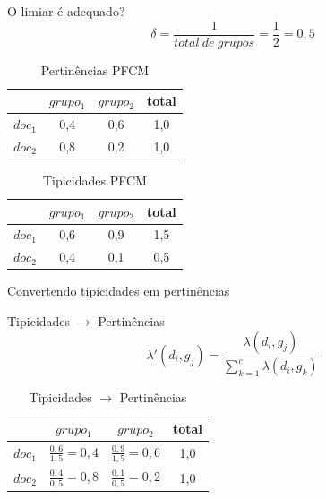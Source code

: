 \documentclass[brazil]{beamer}
\begin{document}
\begin{frame}{O limiar é adequado?}
  \begin{equation}
    \delta = \frac{1}{total\ de\ grupos} = \frac{1}{2} = 0,5
  \end{equation}
    \begin{table}[!htp]
      \centering
      \begin{tabular}{ |l|c|c|c|}
        \hline
        & {\bf$grupo_1$} & {\bf $grupo_2$} & {\alert{total}} \\
        \hline
        $doc_1$ & 0,4 & 0,6 & 1,0 \\
        \hline
        $doc_2$ & 0,8 & 0,2 & 1,0 \\
        \hline
      \end{tabular}
      \caption{Pertinências PFCM}
    \end{table}
    \begin{table}[!htp]
      \centering
      \begin{tabular}{ |l|c|c|c|}
        \hline
        & {\bf$grupo_1$} & {\bf $grupo_2$} & \alert{total} \\
        \hline
        $doc_1$ & 0,6 & 0,9 & 1,5 \\
        \hline
        $doc_2$ & 0,4 & 0,1 & 0,5 \\
        \hline
      \end{tabular}
      \caption{Tipicidades PFCM}
    \end{table}
\end{frame}

\begin{frame}{Convertendo tipicidades em pertinências}
  \begin{alertblock}{Tipicidades $\rightarrow$ Pertinências}
    \begin{equation}
      \lambda'(d_i,g_j) = \frac{\lambda(d_i,g_j)}{\sum_{k=1}^c \lambda(d_i,g_k)}
      \label{eq:tip2pert}
    \end{equation}
  \end{alertblock}

  \begin{table}[!htp]
    \centering
    \begin{tabular}{ |l|c|c|c|}
      \hline
      & {\bf$grupo_1$} & {\bf $grupo_2$} & \alert{total} \\
      \hline
      $doc_1$ & $\frac{0,6}{1,5} = 0,4$ & $\frac{0,9}{1,5} = 0,6$ & 1,0 \\
      \hline
      $doc_2$ & $\frac{0,4}{0,5} = 0,8$ & $\frac{0,1}{0,5} = 0,2$ & 1,0 \\
      \hline
    \end{tabular}
    \caption{Tipicidades $\rightarrow$ Pertinências}
  \end{table}
\end{frame}
\end{document}
